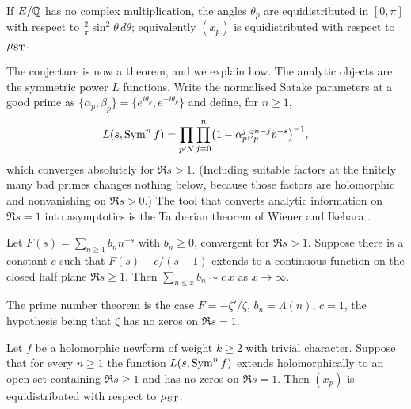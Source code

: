 \begin{conjecture}
If $E/\mathbb{Q}$ has no complex multiplication, the angles $\theta_p$ are equidistributed in $[0,\pi]$ with respect to $\frac{2}{\pi}\sin^2\theta\,d\theta$; equivalently $(x_p)$ is equidistributed with respect to $\mu_{\mathrm{ST}}$.
\end{conjecture}

The conjecture is now a theorem, and we explain how. The analytic objects are the symmetric power $L$ functions. Write the normalised Satake parameters at a good prime as $\{\alpha_p, \beta_p\} = \{e^{i\theta_p}, e^{-i\theta_p}\}$ and define, for $n \ge 1$,
\[
L(s, \operatorname{Sym}^n f) = \prod_{p\nmid N}\prod_{j=0}^n \bigl(1 - \alpha_p^{j}\beta_p^{n-j}p^{-s}\bigr)^{-1},
\]
which converges absolutely for $\Re s > 1$. (Including suitable factors at the finitely many bad primes changes nothing below, because those factors are holomorphic and nonvanishing on $\Re s > 0$.) The tool that converts analytic information on $\Re s = 1$ into asymptotics is the Tauberian theorem of Wiener and Ikehara \cite{wiener1932,wienerikehara1931}.

\begin{theorem}
Let $F(s) = \sum_{n\ge1} b_n n^{-s}$ with $b_n \ge 0$, convergent for $\Re s > 1$. Suppose there is a constant $c$ such that $F(s) - c/(s-1)$ extends to a continuous function on the closed half plane $\Re s \ge 1$. Then $\sum_{n\le x} b_n \sim c\,x$ as $x \to \infty$.
\end{theorem}

The prime number theorem is the case $F = -\zeta'/\zeta$, $b_n = \Lambda(n)$, $c = 1$, the hypothesis being that $\zeta$ has no zeros on $\Re s = 1$.

\begin{theorem}\label{thm:04serre}
Let $f$ be a holomorphic newform of weight $k\ge2$ with trivial character. Suppose that for every $n \ge 1$ the function $L(s, \operatorname{Sym}^n f)$ extends holomorphically to an open set containing $\Re s \ge 1$ and has no zeros on $\Re s = 1$. Then $(x_p)$ is equidistributed with respect to $\mu_{\mathrm{ST}}$.
\end{theorem}

